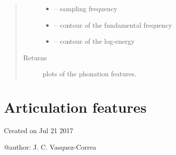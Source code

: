 \documentclass[letterpaper,10pt,english]{sphinxmanual}
\begin{document}
\begin{fulllineitems}
\begin{fulllineitems}
\begin{quote}
\begin{description}
\begin{itemize}
\item {} 
 -- sampling frequency

\item {} 
 -- contour of the fundamental frequency

\item {} 
 -- contour of the log-energy

\end{itemize}

\item[{Returns}] \leavevmode
plots of the phonation features.

\end{description}\end{quote}

\end{fulllineitems}


\end{fulllineitems}



\chapter{Articulation features}
\label{\detokenize{Articulation::doc}}\label{\detokenize{Articulation:articulation-features}}\label{\detokenize{Articulation:module-articulation}}
Created on Jul 21 2017

@author: J. C. Vasquez-Correa
\end{document}
